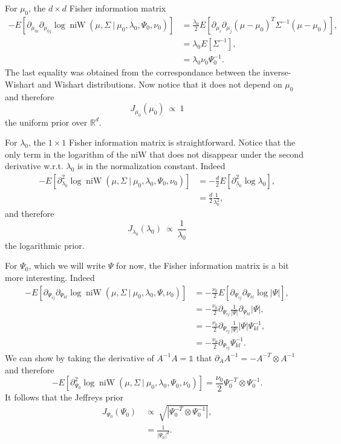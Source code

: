 \documentclass[11pt, oneside]{article}   	%
\DeclareMathOperator{\niW}{niW}
\begin{document}
For $\mu_0$, the $d\times d$ Fisher information matrix
\begin{equation}\begin{split}
-E\left[\partial_{\mu_{0i}}\partial_{\mu_{0j}} \log \niW(\mu,\Sigma~\vert~\mu_0,\lambda_0,\Psi_0,\nu_0)\right] &= \frac{\lambda_0}{2}E[\partial_{\mu_i}\partial_{\mu_j}(\mu - \mu_0)^T\Sigma^{-1}(\mu - \mu_0)],\\
&= \lambda_0 E[\Sigma^{-1}],\\
&= \lambda_0\nu_0\Psi_0^{-1}.
\end{split}\end{equation}
The last equality was obtained from the correspondance between the inverse-Wishart and Wishart distributions. Now notice that it does not depend on $\mu_0$ and therefore
$$J_{\mu_0}(\mu_0)~\propto~1$$
the uniform prior over $\mathbb{R}^d$.

For $\lambda_0$, the $1\times 1$ Fisher information matrix is straightforward. Notice that the only term in the logarithm of the niW that does not disappear under the second derivative w.r.t. $\lambda_0$ is in the normalization constant. Indeed
\begin{equation}\begin{split}
-E\left[\partial^2_{\lambda_0}\log \niW(\mu,\Sigma~\vert~\mu_0,\lambda_0,\Psi_0,\nu_0)\right] &= -\frac{d}{2}E[\partial^2_{\lambda_0}\log \lambda_0],\\
&= \frac{d}{2}\frac{1}{\lambda_0^2},
\end{split}\end{equation}
and therefore
$$J_{\lambda_0}(\lambda_0)~\propto~\frac{1}{\lambda_0}$$
the logarithmic prior.

For $\Psi_0$, which we will write $\Psi$ for now, the Fisher information matrix is a bit more interesting. Indeed
\begin{equation}\begin{split}
-E\left[\partial_{\Psi_{ij}}\partial_{\Psi_{kl}}\log \niW(\mu,\Sigma~\vert~\mu_0,\lambda_0,\Psi,\nu_0)\right] &= -\frac{\nu_0}{2}E[\partial_{\Psi_{ij}}\partial_{\Psi_{kl}}\log\vert\Psi\vert], \\
&=-\frac{\nu_0}{2}\partial_{\Psi_{ij}}\frac{1}{\vert\Psi\vert}\partial_{\Psi_{kl}}\vert\Psi\vert,\\
&= -\frac{\nu_0}{2}\partial_{\Psi_{ij}}\frac{1}{\vert\Psi\vert}\vert\Psi\vert \Psi^{-1}_{kl},\\
&=-\frac{\nu_0}{2} \partial_{\Psi_{ij}}\Psi_{kl}^{-1}.
\end{split}\end{equation}
We can show by taking the derivative of $A^{-1} A = \mathbb{1}$ that $\partial_A A^{-1} = -A^{-
T}\otimes A^{-1}$ and therefore
$$-E\left[\partial^2_{\Psi_{0}}\log \niW(\mu,\Sigma~\vert~\mu_0,\lambda_0,\Psi_0,\nu_0)\right] = \frac{\nu_0}{2}\Psi_0^{-T}\otimes\Psi_0^{-1}.$$
It follows that the Jeffreys prior
\begin{equation}\begin{split}
J_{\Psi_0}(\Psi_0)~&\propto~ \sqrt{\left\vert\Psi_0^{-T}\otimes\Psi_0^{-1}\right\vert},\\
&= \frac{1}{\left\vert\Psi_0\right\vert^d}.
\end{split}\label{eq:jeffpsi}\end{equation}
\end{document}
